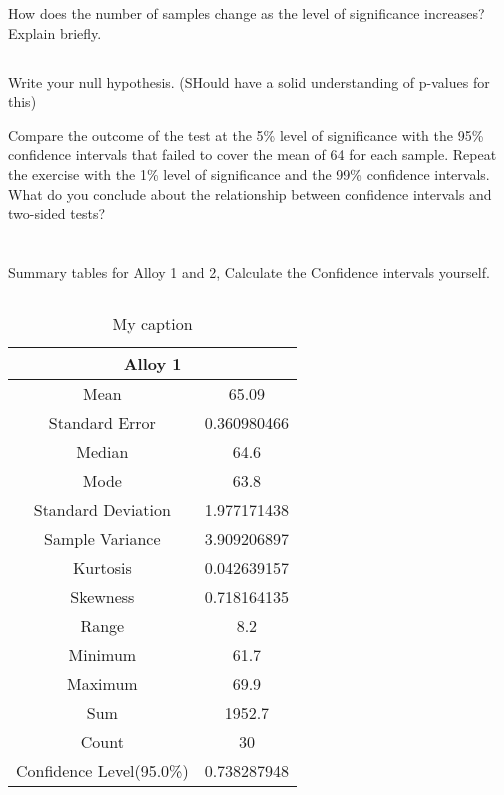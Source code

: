 \documentclass[letterpaper]{article}
\begin{document}
How does the number of samples change as
the level of significance increases? Explain briefly.

\subsection{}%

Write your null hypothesis. (SHould have a solid understanding of p-values for this)

Compare the outcome of the test at the 5\% level of significance with the 95\% confidence intervals
that failed to cover the mean of 64 for each sample. Repeat the exercise with the 1\% level of
significance and the 99\% confidence intervals. What do you conclude about the relationship
between confidence intervals and two-sided tests?

\section{}%
Summary tables for Alloy 1 and 2, Calculate the Confidence intervals yourself.
\subsection{}%

\begin{table}[H]
 \centering
 \begin{tabular}{|c|c|}
  \hline
  \multicolumn{2}{|c|}{Alloy 1}          \\ \hline
  Mean                     & 65.09       \\ \hline
  Standard Error           & 0.360980466 \\ \hline
  Median                   & 64.6        \\ \hline
  Mode                     & 63.8        \\ \hline
  Standard Deviation       & 1.977171438 \\ \hline
  Sample Variance          & 3.909206897 \\ \hline
  Kurtosis                 & 0.042639157 \\ \hline
  Skewness                 & 0.718164135 \\ \hline
  Range                    & 8.2         \\ \hline
  Minimum                  & 61.7        \\ \hline
  Maximum                  & 69.9        \\ \hline
  Sum                      & 1952.7      \\ \hline
  Count                    & 30          \\ \hline
  Confidence Level(95.0\%) & 0.738287948 \\ \hline
 \end{tabular}
 \caption{My caption}
 \label{3a1}
\end{table}
\end{document}
